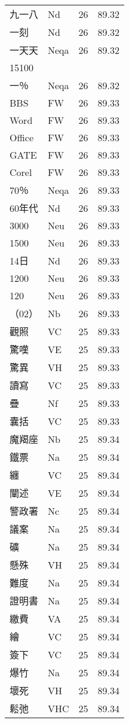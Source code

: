 \documentclass[twocolumn]{book}
\begin{document}
\begin{supertabular}{llrr}
九一八 & Nd & 26 &  89.32\\
一刻 & Nd & 26 &  89.32\\
一天天 & Neqa & 26 &  89.32\\
15100\\
一％ & Neqa & 26 &  89.32\\
ΒΒS & FW & 26 &  89.33\\
Word & FW & 26 &  89.33\\
Office & FW & 26 &  89.33\\
GATE & FW & 26 &  89.33\\
Corel & FW & 26 &  89.33\\
70％ & Neqa & 26 &  89.33\\
60年代 & Nd & 26 &  89.33\\
3000 & Neu & 26 &  89.33\\
1500 & Neu & 26 &  89.33\\
14日 & Nd & 26 &  89.33\\
1200 & Neu & 26 &  89.33\\
120 & Neu & 26 &  89.33\\
（02） & Nb & 26 &  89.33\\
觀照 & VC & 25 &  89.33\\
驚嘆 & VE & 25 &  89.33\\
驚異 & VH & 25 &  89.33\\
讀寫 & VC & 25 &  89.33\\
疊 & Nf & 25 &  89.33\\
囊括 & VC & 25 &  89.33\\
魔羯座 & Nb & 25 &  89.34\\
鐵票 & Na & 25 &  89.34\\
纏 & VC & 25 &  89.34\\
闡述 & VE & 25 &  89.34\\
警政署 & Nc & 25 &  89.34\\
議案 & Na & 25 &  89.34\\
礦 & Na & 25 &  89.34\\
懸殊 & VH & 25 &  89.34\\
難度 & Na & 25 &  89.34\\
證明書 & Na & 25 &  89.34\\
繳費 & VA & 25 &  89.34\\
繪 & VC & 25 &  89.34\\
簽下 & VC & 25 &  89.34\\
爆竹 & Na & 25 &  89.34\\
壞死 & VH & 25 &  89.34\\
鬆弛 & VHC & 25 &  89.34\\

\end{supertabular}
\end{document}

